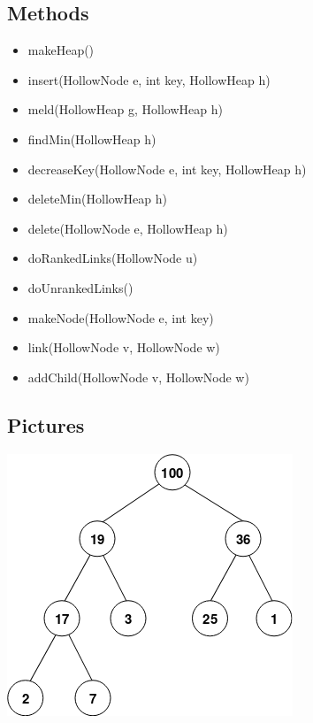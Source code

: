 \documentclass[letter,10pt]{article}
\begin{document}
\subsection{Methods}
\renewcommand\labelitemi{$\square$}
\begin{itemize}
    \item \quad makeHeap()
    \item \quad insert(HollowNode e, int key, HollowHeap h)
    \item \quad meld(HollowHeap g, HollowHeap h)
    \item \quad findMin(HollowHeap h)
    \item \quad decreaseKey(HollowNode e, int key, HollowHeap h)
    \item \quad deleteMin(HollowHeap h)
    \item \quad delete(HollowNode e, HollowHeap h)
    \item \quad doRankedLinks(HollowNode u)
    \item \quad doUnrankedLinks()
    \item \quad makeNode(HollowNode e, int key)
    \item \quad link(HollowNode v, HollowNode w)
    \item \quad addChild(HollowNode v, HollowNode w)
\end{itemize}
\subsection{Pictures}
\begin{center}
\includegraphics[scale=.5]{Max-Heap.png}
\end{center}
\end{document}
